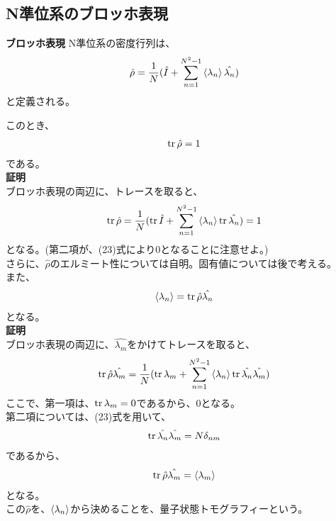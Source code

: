 \documentclass[a4paper,11pt]{jsarticle}
\begin{document}
\subsection{N準位系のブロッホ表現}
\begin{itembox}[l]{\textbf{ブロッホ表現}}
    N準位系の密度行列は、
    \begin{align}
        \hat{\rho} = \frac{1}{N}(\hat I + \sum_{n=1}^{N^2-1} \ev{\lambda_n}\hat{\lambda_n})
    \end{align}
    と定義される。
\end{itembox}
このとき、
\begin{align}
    \trace{\hat{\rho}=1}
\end{align}
である。\\
\textbf{証明}\\
ブロッホ表現の両辺に、トレースを取ると、
\begin{align}
    \trace{\hat{\rho}} = \frac{1}{N}(\trace{\hat{I}} + \sum_{n=1}^{N^2-1}\ev{\lambda_n}\trace{\hat{\lambda_n}}) = 1
\end{align}
となる。(第二項が、(23)式により0となることに注意せよ。)\\
さらに、$\hat{\rho}$のエルミート性については自明。固有値については後で考える。\\
また、
\begin{align}
    \ev{\lambda_n} = \trace{\hat{\rho}\hat{\lambda_n}}
\end{align}
となる。\\
\textbf{証明}\\
ブロッホ表現の両辺に、$\hat{\lambda_m}$をかけてトレースを取ると、
\begin{align}
    \trace{\hat{\rho}\hat{\lambda_m}}=\frac{1}{N}(\trace{\lambda_m}+\sum_{n=1}^{N^2-1}\ev{\lambda_n}\trace{\hat{\lambda_n}\hat{\lambda_m}})
\end{align}
ここで、第一項は、$\trace{\lambda_m}=0$であるから、0となる。\\
第二項については、(23)式を用いて、
\begin{align}
    \trace{\hat{\lambda_n}\hat{\lambda_m}} = N\delta_{nm}
\end{align}
であるから、
\begin{align}
    \trace{\hat{\rho}\hat{\lambda_m}} = \ev{\lambda_m}
\end{align}
となる。\\
この$\hat{\rho}$を、$\ev{\lambda_n}$から決めることを、量子状態トモグラフィーという。\\
\end{document}
